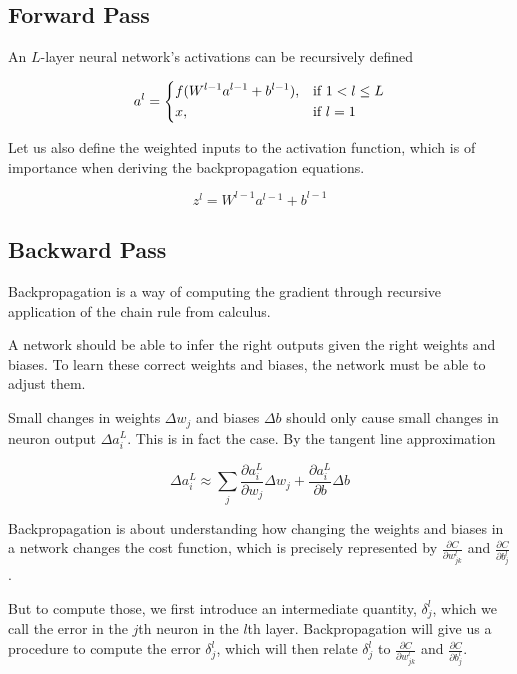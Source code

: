 \subsection{Forward Pass}
\label{subsection:forwardpass}

An $L$-layer neural network's activations can be recursively defined

$$
a^{l} =
\begin{dcases}
    f(W^{l-1}a^{l-1} + b^{l-1}),& \text{if } 1 < l \leq L\\
    x,              & \text{if } l = 1
\end{dcases}
$$

Let us also define the weighted inputs to the activation function, which is of importance when deriving the backpropagation equations.

$$
z^{l} = W^{l-1}a^{l-1} + b^{l-1}
$$

\subsection{Backward Pass}
\label{subsection:backwardpass}

Backpropagation is a way of computing the gradient through recursive application of the chain rule from calculus.

A network should be able to infer the right outputs given the right weights and biases. To learn these correct weights and biases, the network must be able to adjust them.

Small changes in weights $\Delta w_j$ and biases $\Delta b$ should only cause small changes in neuron output $\Delta a^L_i$. This is in fact the case. By the tangent line approximation

$$
\Delta a^L_i \approx \sum_j \frac{\partial a^L_i}{\partial w_j} \Delta w_j + \frac{\partial a^L_i}{\partial b} \Delta b
$$

Backpropagation is about understanding how changing the weights and biases in a network changes the cost function, which is precisely represented by $\frac{\partial C}{\partial w^l_{jk}}$ and $\frac{\partial C}{\partial b^l_j}$.

But to compute those, we first introduce an intermediate quantity, $\delta^l_j$, which we call the error in the $j$th neuron in the $l$th layer. Backpropagation will give us a procedure to compute the error $\delta^l_j$, which will then relate $\delta^l_j$ to $\frac{\partial C}{\partial w^l_{jk}}$ and $\frac{\partial C}{\partial b^l_j}$.




